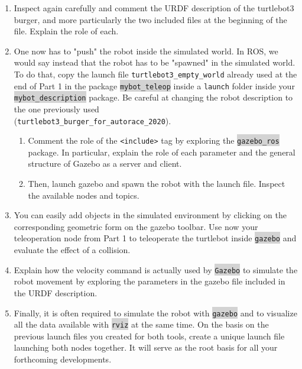 \documentclass[10pt,a4paper]{upmc}
\newcommand{\mytext}[1]{\colorbox{lightgray}{\texttt{#1}}}
\begin{document}
\begin{enumerate}
  \item Inspect again carefully and comment the URDF description of the turtlebot3 burger, and more
        particularly the two included files at the beginning of the file. Explain the role of each.

  \item One now has to "push" the robot inside the simulated world. In ROS, we would say instead
        that the robot has to be "spawned" in the simulated world. To do that, copy the launch file
        \texttt{turtlebot3\_empty\_world} already used at the end of Part 1 in the package
        \mytext{mybot\_teleop} inside a \texttt{launch} folder inside your
        \mytext{mybot\_description} package. Be careful at changing the robot description to the one
        previously used \\(\texttt{turtlebot3\_burger\_for\_autorace\_2020}).
        \begin{enumerate}
          \item Comment the role of the \texttt{<include>} tag by exploring the \mytext{gazebo\_ros}
                package. In particular, explain the role of each parameter and the general structure
                of Gazebo as a server and client.
          \item Then, launch gazebo and spawn the robot with the launch file. Inspect the available
                nodes and topics.
        \end{enumerate}

  \item You can easily add objects in the simulated environment by clicking on the corresponding
        geometric form on the gazebo toolbar. Use now your teleoperation node from Part 1 to
        teleoperate the turtlebot inside \mytext{gazebo} and evaluate the effect of a collision.
  \item Explain how the velocity command is actually used by \mytext{Gazebo} to simulate the robot
        movement by exploring the parameters in the gazebo file included in the URDF description.
  \item Finally, it is often required to simulate the robot with \mytext{gazebo} and to visualize
        all the data available with \mytext{rviz} at the same time. On the basis on the previous
        launch files you created for both tools, create a unique launch file launching both nodes
        together. It will serve as the root basis for all your forthcoming developments.
\end{enumerate}
\end{document}
